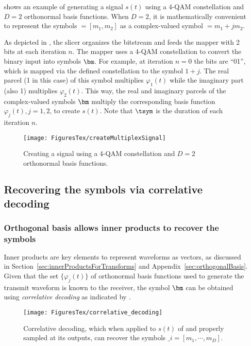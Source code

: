  shows an example of generating a signal $s(t)$ using a 4-QAM constellation and $D=2$ orthonormal basis functions. When $D=2$, it is mathematically convenient to represent the symbols $\bm = [m_1, m_2]$ as a complex-valued symbol $\bm = m_1 + j m_2$.

As depicted in , the slicer organizes the bitstream and feeds the mapper with 2 bits at each iteration $n$. The mapper uses a 4-QAM constellation to convert the binary input into symbols $\bm$. For example, at iteration $n=0$ the bits are ``01'', which is
mapped via the defined constellation to the symbol $1+j$. The real parcel (1 in this case) of this symbol multiplies $\varphi_1(t)$ while the imaginary part (also 1) multiplies $\varphi_2(t)$. This way, the real and imaginary parcels of the complex-valued symbols $\bm$ multiply the corresponding basis function $\varphi_j(t), j=1,2$, to create $s(t)$. Note that $\tsym$ is the duration of each iteration $n$.

\begin{figure}[htbp]
\centering
\texttt{[image: FiguresTex/createMultiplexSignal]}
\caption{Creating a signal using a 4-QAM constellation and $D=2$ orthonormal basis functions.\label{fig:createMultiplexSignal}}
\end{figure}


\subsection{Recovering the symbols via correlative decoding} 
\label{sec:correlativeDecoding}

\subsubsection{Orthogonal basis allows inner products to recover the symbols}

Inner products are key elements to represent waveforms as vectors, as discussed in Section~\ref{sec:innerProductsForTransforms} and Appendix~\ref{sec:orthogonalBasis}. Given that the set $\{\varphi_j(t)\}$ of orthonormal basis functions used to generate the transmit waveform is known to the receiver, the symbol $ \bm $ can be obtained using \emph{correlative decoding} as indicated by .


\begin{figure}[htbp]
\centering
\texttt{[image: FiguresTex/correlative\_decoding]}
\caption{Correlative decoding, which when applied to $s(t)$ of  and properly sampled at its outputs, can recover the symbols $\bm_i = [m_1,\cdots,m_D]$.\label{fig:correlative_decoding}}
\end{figure}

